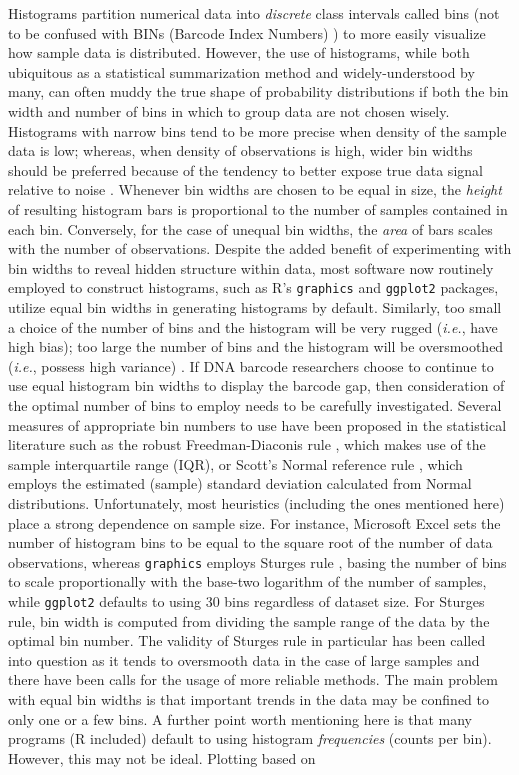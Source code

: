 Histograms partition numerical data into \textit{discrete} class intervals called bins (not to be confused with BINs (Barcode Index Numbers) \cite{ratnasingham2013dna}) to more easily visualize how sample data is distributed. However, the use of histograms, while both ubiquitous as a statistical summarization method and widely-understood by many, can often muddy the true shape of probability distributions if both the bin width and number of bins in which to group data are not chosen wisely. Histograms with narrow bins tend to be more precise when density of the sample data is low; whereas, when density of observations is high, wider bin widths should be preferred because of the tendency to better expose true data signal relative to noise \cite{scott1979optimal}. Whenever bin widths are chosen to be equal in size, the \textit{height} of resulting histogram bars is proportional to the number of samples contained in each bin. Conversely, for the case of unequal bin widths, the \textit{area} of bars scales with the number of observations. Despite the added benefit of experimenting with bin widths to reveal hidden structure within data, most software now routinely employed to construct histograms, such as R's {\tt graphics} \cite{r2018language} and {\tt ggplot2} packages, utilize equal bin widths in generating histograms by default. Similarly, too small a choice of the number of bins and the histogram will be very rugged (\textit{i.e.}, have high bias); too large the number of bins and the histogram will be oversmoothed (\textit{i.e.}, possess high variance) \cite{scott1979optimal}. If DNA barcode researchers choose to continue to use equal histogram bin widths to display the barcode gap, then consideration of the optimal number of bins to employ needs to be carefully investigated. Several measures of appropriate bin numbers to use have been proposed in the statistical literature such as the robust Freedman-Diaconis rule \cite{freedman1981on}, which makes use of the sample interquartile range (IQR), or Scott's Normal reference rule \cite{scott1979optimal}, which employs the estimated (sample) standard deviation calculated from Normal distributions. Unfortunately, most heuristics (including the ones mentioned here) place a strong dependence on sample size. For instance, Microsoft{\textregistered} Excel sets the number of histogram bins to be equal to the square root of the number of data observations, whereas {\tt graphics} employs Sturges rule \cite{sturges1926choice}, basing the number of bins to scale proportionally with the base-two logarithm of the number of samples, while {\tt ggplot2} defaults to using 30 bins regardless of dataset size. For Sturges rule, bin width is computed from dividing the sample range of the data by the optimal bin number. The validity of Sturges rule in particular has been called into question as it tends to oversmooth data in the case of large samples \cite{hyndman1995problem} and there have been calls for the usage of more reliable methods. The main problem with equal bin widths is that important trends in the data may be confined to only one or a few bins. A further point worth mentioning here is that many programs (R included) default to using histogram \textit{frequencies} (counts per bin). However, this may not be ideal. Plotting based on 